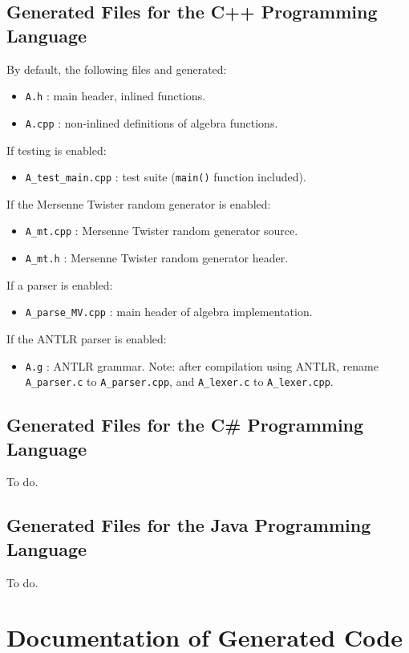 \documentclass[10pt, a4paper]{article}
\begin{document}
\subsection{Generated Files for the C++ Programming Language}

By default, the following files and generated:
\begin{itemize}
\item {\tt A.h} : main header, inlined functions.
\item {\tt A.cpp} : non-inlined definitions of algebra functions.
\end{itemize}
If testing is enabled:
\begin{itemize}
\item {\tt A\_test\_main.cpp} : test suite ({\tt main()} function included).
\end{itemize}
If the Mersenne Twister random generator is enabled:
\begin{itemize}
\item {\tt A\_mt.cpp} : Mersenne Twister random generator source.
\item {\tt A\_mt.h} : Mersenne Twister random generator header.
\end{itemize}
If a parser is enabled:
\begin{itemize}
\item {\tt A\_parse\_MV.cpp} : main header of algebra implementation.
\end{itemize}
If the ANTLR parser is enabled:
\begin{itemize}
\item {\tt A.g} : ANTLR grammar. Note: after compilation using ANTLR, rename
{\tt A\_parser.c} to {\tt A\_parser.cpp}, and {\tt A\_lexer.c} to {\tt A\_lexer.cpp}.
\end{itemize}

\subsection{Generated Files for the C\# Programming Language}

To do.

\subsection{Generated Files for the Java Programming Language}

To do.

\section{Documentation of Generated Code}
\end{document}
